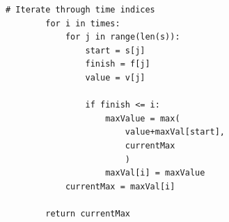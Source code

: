 \documentclass{article}
\begin{document}
\begin{enumerate}[label=(\alph*)]
\begin{lstlisting}[frame=single]
        # Iterate through time indices
        for i in times:
            for j in range(len(s)):
                start = s[j]
                finish = f[j]
                value = v[j]

                if finish <= i:
                    maxValue = max(
                        value+maxVal[start],
                        currentMax
                        )
                    maxVal[i] = maxValue
            currentMax = maxVal[i]
        
        return currentMax
        \end{lstlisting}
\end{enumerate}
\end{document}
